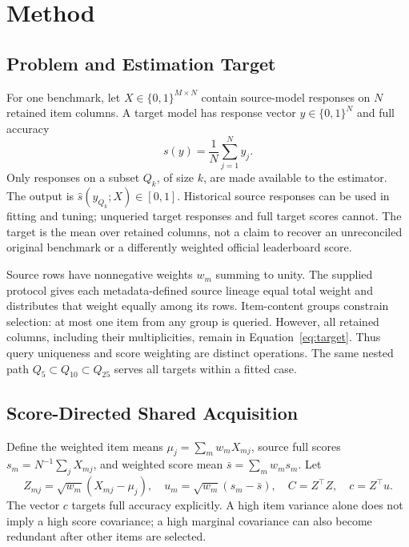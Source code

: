 \documentclass{article}
\begin{document}
\section{Method}
\subsection{Problem and Estimation Target}
For one benchmark, let $X\in\{0,1\}^{M\times N}$ contain source-model responses on $N$ retained item columns. A target model has response vector $y\in\{0,1\}^{N}$ and full accuracy
\begin{equation}
s(y)=\frac{1}{N}\sum_{j=1}^{N}y_j.
\label{eq:target}
\end{equation}
Only responses on a subset $Q_k$, of size $k$, are made available to the estimator. The output is $\hat s(y_{Q_k};X)\in[0,1]$. Historical source responses can be used in fitting and tuning; unqueried target responses and full target scores cannot. The target is the mean over retained columns, not a claim to recover an unreconciled original benchmark or a differently weighted official leaderboard score.

Source rows have nonnegative weights $w_m$ summing to unity. The supplied protocol gives each metadata-defined source lineage equal total weight and distributes that weight equally among its rows. Item-content groups constrain selection: at most one item from any group is queried. However, all retained columns, including their multiplicities, remain in Equation~\ref{eq:target}. Thus query uniqueness and score weighting are distinct operations. The same nested path $Q_5\subset Q_{10}\subset Q_{25}$ serves all targets within a fitted case.

\subsection{Score-Directed Shared Acquisition}
Define the weighted item means $\mu_j=\sum_m w_mX_{mj}$, source full scores $s_m=N^{-1}\sum_jX_{mj}$, and weighted score mean $\bar s=\sum_mw_ms_m$. Let
\begin{equation}
Z_{mj}=\sqrt{w_m}(X_{mj}-\mu_j),\quad
u_m=\sqrt{w_m}(s_m-\bar s),\quad C=Z^\top Z,\quad c=Z^\top u.
\label{eq:covariance}
\end{equation}
The vector $c$ targets full accuracy explicitly. A high item variance alone does not imply a high score covariance; a high marginal covariance can also become redundant after other items are selected.
\end{document}
